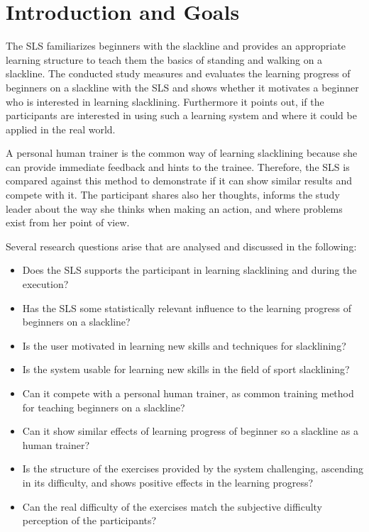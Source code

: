 \section{Introduction and Goals}\label{6_introduction}
The SLS familiarizes beginners with the slackline and provides an appropriate learning structure to teach them the basics of standing and walking on a slackline.
The conducted study measures and evaluates the learning progress of beginners on a slackline with the SLS and shows whether it motivates a beginner who is interested in learning slacklining.
Furthermore it points out, if the participants are interested in using such a learning system and where it could be applied in the real world.

A personal human trainer is the common way of learning slacklining because she can provide immediate feedback and hints to the trainee.
Therefore, the SLS is compared against this method to demonstrate if it can show similar results and compete with it.
The participant shares also her thoughts, informs the study leader about the way she thinks when making an action, and where problems exist from her point of view.

Several research questions arise that are analysed and discussed in the following:

\begin{itemize}
\item Does the SLS supports the participant in learning slacklining and during the execution?
\item Has the SLS some statistically relevant influence to the learning progress of beginners on a slackline?
\item Is the user motivated in learning new skills and techniques for slacklining?
\item Is the system usable for learning new skills in the field of sport slacklining?
\item Can it compete with a personal human trainer, as common training method for teaching beginners on a slackline?
\item Can it show similar effects of learning progress of beginner so a slackline as a human trainer?
\item Is the structure of the exercises provided by the system challenging, ascending in its difficulty, and shows positive effects in the learning progress?
\item Can the real difficulty of the exercises match the subjective difficulty perception of the participants?
\end{itemize}
